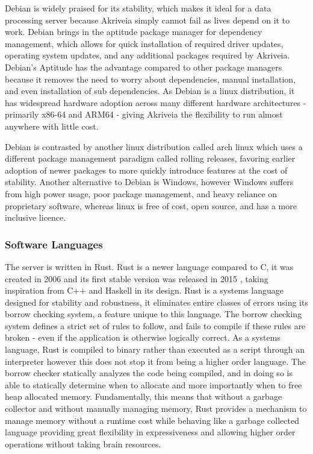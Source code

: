 \bigskip
Debian is widely praised for its stability, which makes it ideal for a data processing server because Akriveia simply cannot fail as lives depend on it to work.
Debian brings in the aptitude package manager for dependency management, which allows for quick installation of required driver updates, operating system updates, and any additional packages required by Akriveia.
Debian's Aptitude has the advantage compared to other package managers because it removes the need to worry about dependencies, manual installation, and even installation of sub dependencies.
As Debian is a linux distribution, it has widespread hardware adoption across many different hardware architectures - primarily x86-64 and ARM64 - giving Akriveia the flexibility to run almost anywhere with little cost.

\bigskip
Debian is contrasted by another linux distribution called arch linux which uses a different package management paradigm called rolling releases, favoring earlier adoption of newer packages to more quickly introduce features at the cost of stability.
Another alternative to Debian is Windows, however Windows suffers from high power usage, poor package management, and heavy reliance on proprietary software, whereas linux is free of cost, open source, and has a more inclusive licence.

\bigskip
\subsubsection{Software Languages}
The server is written in Rust.
Rust is a newer language compared to C, it was created in 2006 \cite{rust_graydon_interview} and its first stable version was released in 2015 \cite{rust_releases}, taking inspiration from C++ and Haskell in its design.
Rust is a systems language designed for stability and robustness, it eliminates entire classes of errors using its borrow checking system, a feature unique to this language.
The borrow checking system defines a strict set of rules to follow, and fails to compile if these rules are broken - even if the application is otherwise logically correct.
As a systems language, Rust is compiled to binary rather than executed as a script through an interpreter however this does not stop it from being a higher order language.
The borrow checker statically analyzes the code being compiled, and in doing so is able to statically determine when to allocate and more importantly when to free heap allocated memory.
Fundamentally, this means that without a garbage collector and without manually managing memory, Rust provides a mechanism to manage memory without a runtime cost while behaving like a garbage collected language providing great flexibility in expressiveness and allowing higher order operations without taking brain resources.

